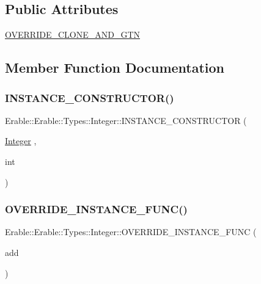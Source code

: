 \subsection*{Public Attributes}
\begin{DoxyCompactItemize}
\item 
\mbox{\hyperlink{class_erable_1_1_erable_1_1_types_1_1_integer_a42b591edd7b42ff1dbeb9e174c7c332f}{O\+V\+E\+R\+R\+I\+D\+E\+\_\+\+C\+L\+O\+N\+E\+\_\+\+A\+N\+D\+\_\+\+G\+TN}}
\end{DoxyCompactItemize}


\subsection{Member Function Documentation}
\mbox{\label{class_erable_1_1_erable_1_1_types_1_1_integer_ac3259433602dbc86d8cca86943360c5e}} 
\subsubsection{\texorpdfstring{INSTANCE\_CONSTRUCTOR()}{INSTANCE\_CONSTRUCTOR()}}
{\footnotesize\ttfamily Erable\+::\+Erable\+::\+Types\+::\+Integer\+::\+I\+N\+S\+T\+A\+N\+C\+E\+\_\+\+C\+O\+N\+S\+T\+R\+U\+C\+T\+OR (\begin{DoxyParamCaption}\item[{\mbox{\hyperlink{class_erable_1_1_erable_1_1_types_1_1_integer}{Integer}}}]{,  }\item[{int}]{ }\end{DoxyParamCaption})}

\mbox{\label{class_erable_1_1_erable_1_1_types_1_1_integer_a32d4ef66710ffb4807bd02be06d64deb}} 
\subsubsection{\texorpdfstring{OVERRIDE\_INSTANCE\_FUNC()}{OVERRIDE\_INSTANCE\_FUNC()}\hspace{0.1cm}{\footnotesize\ttfamily [1/8]}}
{\footnotesize\ttfamily Erable\+::\+Erable\+::\+Types\+::\+Integer\+::\+O\+V\+E\+R\+R\+I\+D\+E\+\_\+\+I\+N\+S\+T\+A\+N\+C\+E\+\_\+\+F\+U\+NC (\begin{DoxyParamCaption}\item[{add}]{ }\end{DoxyParamCaption})}

